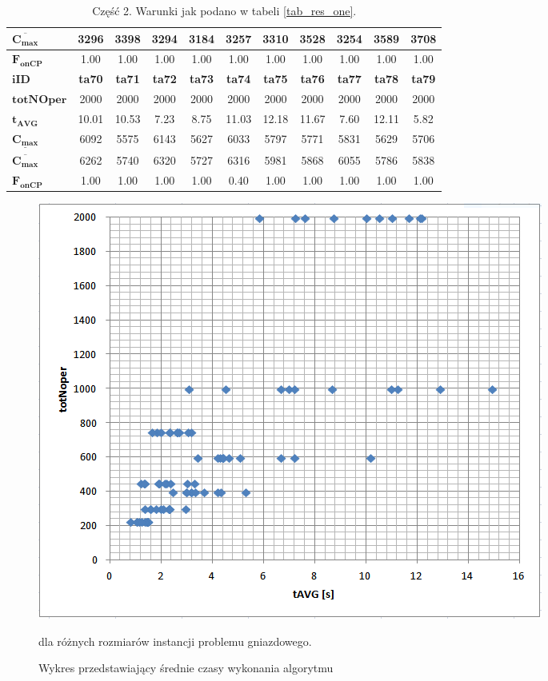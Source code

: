 \documentclass[archivemode]{mgr}
\begin{document}
\begin{table}[!ht]
\begin{tabularx}{\textwidth}{|X|c|c|c|c|c|c|c|c|c|c|}
\hline
$\mathbf{\overline{C_{max}}}$ & 3296 & 3398 & 3294 & 3184 & 3257 & 3310 & 3528 & 3254 & 3589 & 3708\\
\hline
$\mathbf{F_{onCP}}$ & 1.00 & 1.00 & 1.00 & 1.00 & 1.00 & 1.00 & 1.00 & 1.00 & 1.00 & 1.00\\
\hline
\hline
$\mathbf{iID}$ & \textbf{ta70} & \textbf{ta71} & \textbf{ta72} & \textbf{ta73} & \textbf{ta74} & \textbf{ta75} & \textbf{ta76} & \textbf{ta77} & \textbf{ta78} & \textbf{ta79}\\
\hline
$\mathbf{totNOper}$ & 2000 & 2000 & 2000 & 2000 & 2000 & 2000 & 2000 & 2000 & 2000 & 2000\\
\hline
$\mathbf{t_{AVG}}$ & 10.01 & 10.53 & 7.23 & 8.75 & 11.03 & 12.18 & 11.67 & 7.60 & 12.11 & 5.82\\
\hline
$\mathbf{\underline{C_{max}}}$ & 6092 & 5575 & 6143 & 5627 & 6033 & 5797 & 5771 & 5831 & 5629 & 5706\\
\hline
$\mathbf{\overline{C_{max}}}$ & 6262 & 5740 & 6320 & 5727 & 6316 & 5981 & 5868 & 6055 & 5786 & 5838\\
\hline
$\mathbf{F_{onCP}}$ & 1.00 & 1.00 & 1.00 & 1.00 & 0.40 & 1.00 & 1.00 & 1.00 & 1.00 & 1.00\\
\hline
\end{tabularx}
\caption{Część 2. Warunki jak podano w tabeli \ref{tab_res_one}.}
\label{tab_res_two}
\renewcommand{\arraystretch}{1.0}
\end{table}
%
\begin{figure}[h!]
\begin{center}
\includegraphics[scale=0.7]{rysunki/wykres_czas_iID.png}
\caption{Wykres przedstawiający średnie czasy wykonania algorytmu}{dla różnych rozmiarów instancji problemu gniazdowego.}
\label{rys_wykres_czas_iID}
\end{center}
\end{figure}
\end{document}
